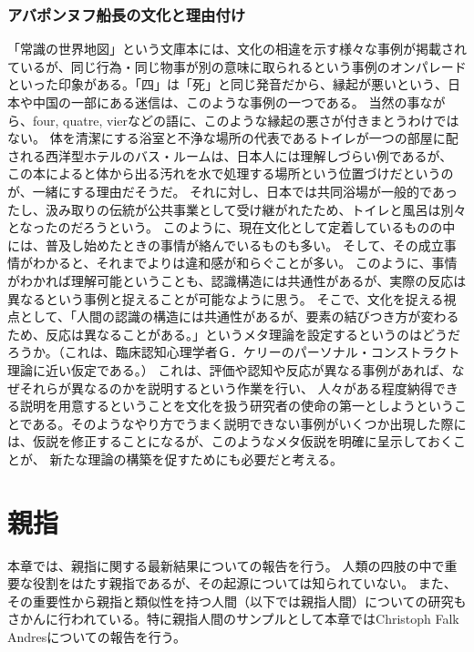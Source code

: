 \documentclass[12pt]{jsarticle}
\begin{document}
\subsubsection{アバポンヌフ船長の文化と理由付け}
「常識の世界地図」という文庫本には、文化の相違を示す様々な事例が掲載されているが、同じ行為・同じ物事が別の意味に取られるという事例のオンパレードといった印象がある。「四」は「死」と同じ発音だから、縁起が悪いという、日本や中国の一部にある迷信は、このような事例の一つである。
当然の事ながら、four, quatre, vierなどの語に、このような縁起の悪さが付きまとうわけではない。
体を清潔にする浴室と不浄な場所の代表であるトイレが一つの部屋に配される西洋型ホテルのバス・ルームは、日本人には理解しづらい例であるが、
この本によると体から出る汚れを水で処理する場所という位置づけだというのが、一緒にする理由だそうだ。
それに対し、日本では共同浴場が一般的であったし、汲み取りの伝統が公共事業として受け継がれたため、トイレと風呂は別々となったのだろうという。
このように、現在文化として定着しているものの中には、普及し始めたときの事情が絡んでいるものも多い。
そして、その成立事情がわかると、それまでよりは違和感が和らぐことが多い。
このように、事情がわかれば理解可能ということも、認識構造には共通性があるが、実際の反応は異なるという事例と捉えることが可能なように思う。
そこで、文化を捉える視点として、「人間の認識の構造には共通性があるが、要素の結びつき方が変わるため、反応は異なることがある。」というメタ理論を設定するというのはどうだろうか。（これは、臨床認知心理学者Ｇ．ケリーのパーソナル・コンストラクト理論に近い仮定である。）
これは、評価や認知や反応が異なる事例があれば、なぜそれらが異なるのかを説明するという作業を行い、
人々がある程度納得できる説明を用意するということを文化を扱う研究者の使命の第一としようということである。そのようなやり方でうまく説明できない事例がいくつか出現した際には、仮説を修正することになるが、このようなメタ仮説を明確に呈示しておくことが、
新たな理論の構築を促すためにも必要だと考える。

\newpage
\section{親指}
本章では、親指に関する最新結果についての報告を行う。
人類の四肢の中で重要な役割をはたす親指であるが、その起源については知られていない。
また、その重要性から親指と類似性を持つ人間（以下では親指人間）についての研究もさかんに行われている。特に親指人間のサンプルとして本章ではChristoph Falk Andresについての報告を行う。
\end{document}
